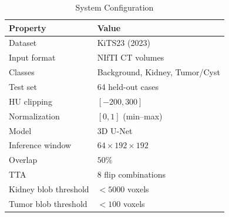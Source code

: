 \begin{table}[!t]
\caption{System Configuration}
\label{tab:pipeline_config}
\centering
\begin{tabular}{@{}ll@{}}
\toprule
\textbf{Property} & \textbf{Value} \\
\midrule
Dataset & KiTS23 (2023) \\
Input format & NIfTI CT volumes \\
Classes & Background, Kidney, Tumor/Cyst \\
Test set & 64 held-out cases \\
\midrule
HU clipping & $[-200, 300]$ \\
Normalization & $[0, 1]$ (min--max) \\
\midrule
Model & 3D U-Net \\
Inference window & $64 \times 192 \times 192$ \\
Overlap & $50\%$ \\
TTA & 8 flip combinations \\
\midrule
Kidney blob threshold & $< 5000$ voxels \\
Tumor blob threshold & $< 100$ voxels \\
\bottomrule
\end{tabular}
\end{table}
